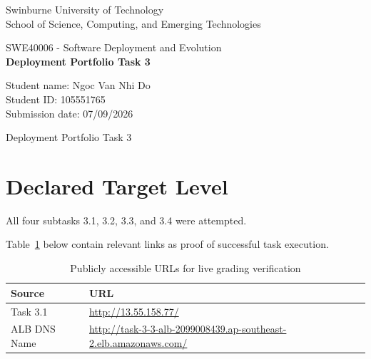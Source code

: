\documentclass{article}
\begin{document}
\begin{titlepage}
\begin{center}
\vspace*{1cm}

Swinburne University of Technology \\
School of Science, Computing, and Emerging Technologies
\vspace{8cm}

SWE40006 - Software Deployment and Evolution \\
\textbf{Deployment Portfolio Task 3}
\vfill

Student name: Ngoc Van Nhi Do \\
Student ID: 105551765 \\
Submission date: 07/09/2026
\end{center}
\end{titlepage}

\pagestyle{fancy}
\fancyfoot{}
\renewcommand{\footrulewidth}{0.4pt}%
\fancyfoot[R]{\small\thepage}

\newpage

\begin{center}
\vspace*{2px}
{\LARGE
\setlength{\baselineskip}{2em}
Deployment Portfolio Task 3
}
\end{center}

\section{Declared Target Level}

All four subtasks 3.1, 3.2, 3.3, and 3.4 were attempted.

Table~\ref{tab:links} below contain relevant links as proof of successful task execution.

\begin{table}[ht]
\centering
\caption{Publicly accessible URLs for live grading verification} 
\label{tab:links}
\vspace{2pt}
\def\arraystretch{1.5}
\begin{tabular}{|p{2cm}|p{14cm}|}
\hline
\textbf{Source} & \textbf{URL} \\
\hline
Task 3.1 & \url{http://13.55.158.77/} \\
\hline
ALB DNS Name & \url{http://task-3-3-alb-2099008439.ap-southeast-2.elb.amazonaws.com/}\\
\hline
\end{tabular}
\end{table}
\end{document}
